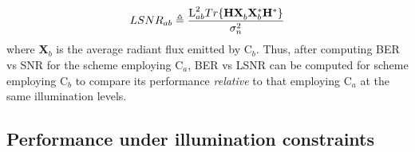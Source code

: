 \documentclass[10pt,letterpaper]{article}
\newcommand{\vm}[1]{{\bf{#1}}}
\begin{document}
\begin{equation}
	LSNR_{ab} \triangleq \frac{\text{L}^{2}_{ab}Tr\{\vm{H}\vm{X}^{ }_{b}\vm{X}^{*}_{b}\vm{H}^{*}\}}{\sigma^{2}_{n}} 
	\label{eqLSNR}
\end{equation}
where \vm{X}$_{b}$ is the average radiant flux emitted by C$_b$. Thus, after computing BER vs SNR for the scheme employing C$_a$, BER vs LSNR can be computed for scheme employing C$_b$ to compare its performance \textit{relative} to that employing C$_a$ at the same illumination levels.

\subsection{Performance under illumination constraints}\label{ssCSKLSNR}
\end{document}
